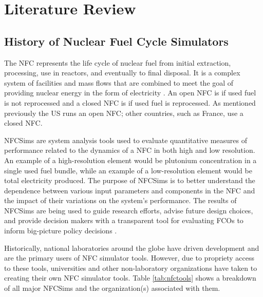 \chapter{Literature Review}

\section{History of Nuclear Fuel Cycle Simulators}
The \gls{NFC} represents the life cycle of nuclear fuel from initial
extraction, processing, use in reactors, and eventually to 
final disposal.
It is a complex system of facilities and mass flows 
that are combined to meet the goal of providing nuclear energy 
in the 
form of electricity \cite{yacout_modeling_2005}.
An open \gls{NFC} is if used fuel is not reprocessed and a 
closed \gls{NFC} is if used fuel is reprocessed. 
As mentioned previously the \gls{US} runs an open 
\gls{NFC}; other countries, such as France, use a closed \gls{NFC}.

\glspl{NFCSim} are system analysis tools used to evaluate 
quantitative measures of performance related to the dynamics of 
a \gls{NFC} in both high and low resolution. 
An example of a high-resolution element would be plutonium 
concentration in a single used fuel bundle, while an example 
of a low-resolution element would be total electricity produced. 
The purpose of \glspl{NFCSim} is to better understand the 
dependence between various input parameters and components 
in the \gls{NFC} and the impact of their variations on 
the system's performance. 
The results of \glspl{NFCSim} are being used to guide research 
efforts, advise future design choices, and provide 
decision makers with a transparent tool for evaluating \glspl{FCO} 
to inform big-picture policy decisions \cite{yacout_modeling_2005}.

Historically, national laboratories around the globe have driven 
development and are the primary users of \gls{NFC} simulator tools. 
However, due to propriety access to these tools, universities and 
other non-laboratory organizations have taken to creating their 
own \gls{NFC} simulator tools. 
Table \ref{tab:nfctools} shows a breakdown of all major \glspl{NFCSim}
and the organization(s) associated with them.  

